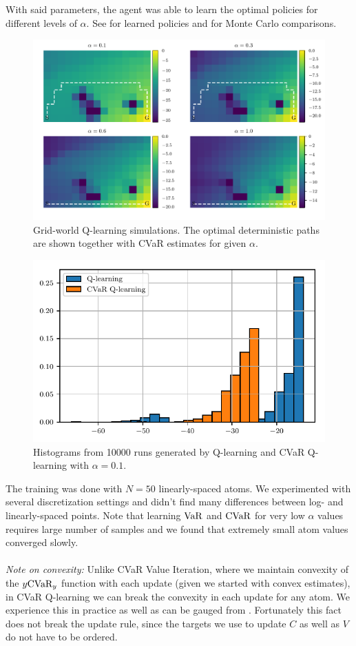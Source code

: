 With said parameters, the agent was able to learn the optimal policies for different levels of $\alpha$. See  for learned policies and  for Monte Carlo comparisons.

\begin{figure}[h]
\center
\includegraphics[width=\linewidth]{gfx/q_optimal_paths.pdf}
\caption[Grid-world CVaR Q-learning simulations.]{Grid-world Q-learning simulations. The optimal deterministic paths are shown together with CVaR estimates for given $\alpha$.}
\label{fig:qgrid}
\end{figure}


\begin{figure}[h]
\center
\includegraphics[width=0.8\linewidth]{gfx/sample_hist.pdf}
\caption[Grid-world CVaR Q-learning histograms.]{Histograms from 10000 runs generated by Q-learning and CVaR Q-learning with $\alpha=0.1$.}
\label{fig:qhist}
\end{figure}

The training was done with $N=50$ linearly-spaced atoms. We experimented with several discretization settings and didn't find many differences between log- and linearly-spaced points. Note that learning $\text{VaR}$ and $\text{CVaR}$ for very low $\alpha$ values requires large number of samples and we found that extremely small atom values converged slowly.
\\
\\
\textit{Note on convexity:} Unlike CVaR Value Iteration, where we maintain convexity of the $y\text{CVaR}_y$ function with each update (given we started with convex estimates), in CVaR Q-learning we can break the convexity in each update for any atom. We experience this in practice as well as can be gauged from . Fortunately this fact does not break the update rule, since the targets we use to update $C$ as well as $V$ do not have to be ordered.


